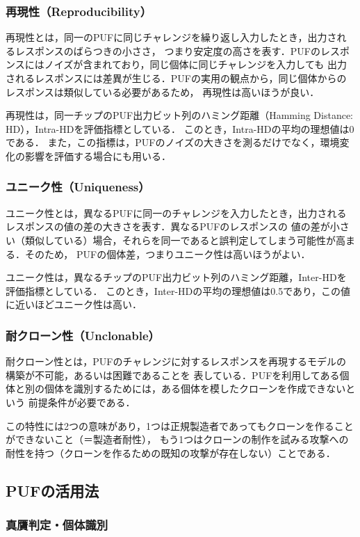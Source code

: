\documentclass[technicalreport]{ieicej} %
\begin{document}
\subsubsection{再現性（Reproducibility）}
再現性とは，同一のPUFに同じチャレンジを繰り返し入力したとき，出力されるレスポンスのばらつきの小ささ，
つまり安定度の高さを表す．PUFのレスポンスにはノイズが含まれており，同じ個体に同じチャレンジを入力しても
出力されるレスポンスには差異が生じる．PUFの実用の観点から，同じ個体からのレスポンスは類似している必要があるため，
再現性は高いほうが良い．

再現性は，同一チップのPUF出力ビット列のハミング距離（Hamming Distance: HD），Intra-HDを評価指標としている．
このとき，Intra-HDの平均の理想値は0である．
また，この指標は，PUFのノイズの大きさを測るだけでなく，環境変化の影響を評価する場合にも用いる．
\subsubsection{ユニーク性（Uniqueness）}
ユニーク性とは，異なるPUFに同一のチャレンジを入力したとき，出力されるレスポンスの値の差の大きさを表す．異なるPUFのレスポンスの
値の差が小さい（類似している）場合，それらを同一であると誤判定してしまう可能性が高まる．そのため，
PUFの個体差，つまりユニーク性は高いほうがよい．

ユニーク性は，異なるチップのPUF出力ビット列のハミング距離，Inter-HDを評価指標としている．
このとき，Inter-HDの平均の理想値は0.5であり，この値に近いほどユニーク性は高い．
\subsubsection{耐クローン性（Unclonable）}
耐クローン性とは，PUFのチャレンジに対するレスポンスを再現するモデルの構築が不可能，あるいは困難であることを
表している．PUFを利用してある個体と別の個体を識別するためには，ある個体を模したクローンを作成できないという
前提条件が必要である．

この特性には2つの意味があり，1つは正規製造者であってもクローンを作ることができないこと（＝製造者耐性），
もう1つはクローンの制作を試みる攻撃への耐性を持つ（クローンを作るための既知の攻撃が存在しない）ことである．
\subsection{PUFの活用法}
\label{puf use}
\subsubsection{真贋判定・個体識別}
\end{document}
